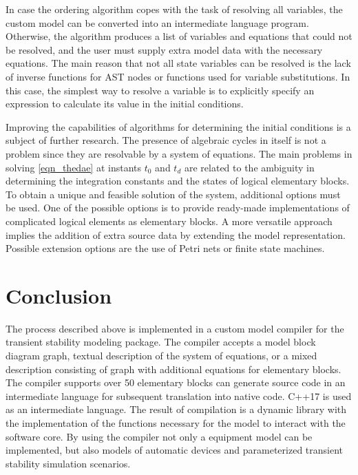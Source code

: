 \documentclass[lettersize,journal]{IEEEtran}
\begin{document}
In case the ordering algorithm copes with the task of resolving all variables, the custom model can be converted into an
intermediate language program. Otherwise, the algorithm produces a list of variables and equations that could not be resolved,
and the user must supply extra model data with the necessary equations. The main reason that not all 
state variables can be resolved is the lack of inverse functions for AST nodes or functions used for variable substitutions. 
In this case, the simplest way to resolve a variable is to explicitly specify an expression to calculate its value in the 
initial conditions.

Improving the capabilities of algorithms for determining the initial conditions is a subject of further research. 
The presence of algebraic cycles in itself is not a problem since they are resolvable by a system of equations. The main 
problems in solving \eqref{eqn_thedae} at instants \(t_0\) and \(t_d\) are related to the ambiguity in determining the 
integration constants and the states of logical elementary blocks. To obtain a unique and feasible solution of the system, 
additional options must be used. One of the possible options is to provide ready-made implementations 
of complicated logical elements as elementary blocks. A more versatile approach implies the addition of extra source data by 
extending the model representation. Possible extension options are the use of Petri nets or finite state machines.

\section{Conclusion}

The process described above is implemented in a custom model compiler for the transient stability modeling package. 
The compiler accepts a model block diagram graph, textual description of the system of equations, or a mixed description consisting of
graph with additional equations for elementary blocks. The compiler supports over 50 elementary blocks can generate source code in an intermediate 
language for subsequent translation into native code. C++17 is used as an intermediate language. 
The result of compilation is a dynamic library with the implementation of the functions necessary for the model to interact with the software core. 
By using the compiler not only a equipment model can be implemented, but also models of automatic devices and parameterized transient stability simulation scenarios.
\end{document}
